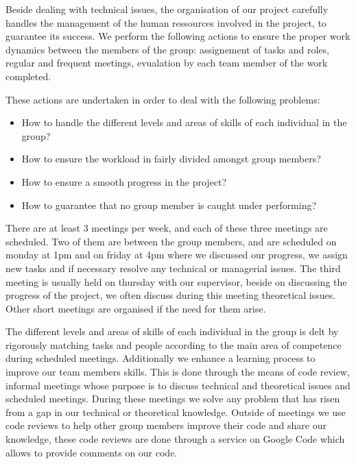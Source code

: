 Beside dealing with technical issues, the organisation of our project carefully handles the management of the human ressources involved in the project, to guarantee its success. We perform the following actions to ensure the proper work dynamics between the members of the group: assignement of tasks and roles, regular and frequent meetings, evualation by each team member of the work completed.

These actions are undertaken in order to deal with the following problems:

\begin{itemize}
\item How to handle the different levels and areas of skills of each individual in the group?
\item How to ensure the workload in fairly divided amongst group members?
\item How to ensure a smooth progress in the project?
\item How to guarantee that no group member is caught under performing?
\end{itemize}

There are at least 3 meetings per week, and each of these three meetings are scheduled. Two of them are between the group members, and are scheduled on monday at 1pm and on friday at 4pm where we discussed our progress, we assign new tasks and if necessary resolve any technical or managerial issues. The third meeting is usually held on thursday with our supervisor, beside on discussing the progress of the project, we often discuss during this meeting theoretical issues. Other short meetings are organised if the need for them arise.

The different levels and areas of skills of each individual in the group is delt by rigorously matching tasks and people according to the main area of competence during scheduled meetings. Additionally we enhance a learning process to improve our team members skills. This is done through the means of code review, informal meetings whose purpose is to discuss technical and theoretical issues and scheduled meetings. During these meetings we solve any problem that has risen from a gap in our technical or theoretical knowledge. Outside of meetings we use code reviews to help other group members improve their code and share our knowledge, these code reviews are done through a service on Google Code which allows to provide comments on our code.

